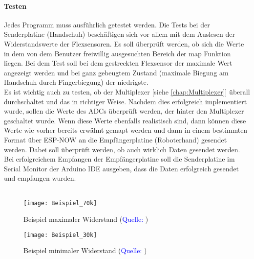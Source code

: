 \documentclass[titlepage,12pt,twoside]{article}
\begin{document}
\paragraph{Testen}
\hfill \break
\hfill \break
Jedes Programm muss ausführlich getestet werden. Die Tests bei der Senderplatine (Handschuh) beschäftigen sich vor allem mit 
dem Auslesen der Widerstandswerte der Flexsensoren. Es soll überprüft werden, ob sich die Werte in dem von dem Benutzer 
freiwillig ausgesuchten Bereich der map Funktion liegen. Bei dem Test soll bei dem gestreckten Flexsensor der maximale Wert 
angezeigt werden und bei ganz gebeugtem Zustand (maximale Biegung am Handschuh durch Fingerbiegung) der niedrigste. \\ 
Es ist wichtig auch zu testen, ob der Multiplexer [siehe \textcolor{blue}{\autoref{chap:Multiplexer}}] überall durchschaltet und das in richtiger Weise. Nachdem dies erfolgreich 
implementiert wurde, sollen die Werte des ADCs überprüft werden, der hinter den Multiplexer geschaltet wurde. Wenn diese Werte 
ebenfalls realistisch sind, dann können diese Werte wie vorher bereits erwähnt gemapt werden und dann in einem bestimmten Format 
über ESP-NOW an die Empfängerplatine (Roboterhand) gesendet werden. Dabei soll überprüft werden, ob auch wirklich Daten 
gesendet werden. Bei erfolgreichem Empfangen der Empfängerplatine soll die Senderplatine im Serial Monitor der Arduino IDE 
ausgeben, dass die Daten erfolgreich gesendet und empfangen wurden. \\
\\
\begin{figure}[H]
	\begin{center}
		\scalebox{0.7}
		{\texttt{[image: Beispiel\_70k]}}
		\caption{Beispiel maximaler Widerstand (\textcolor{blue}{Quelle: \cite{Pelayo}})}
		\label{fig:Beispiel_70k}			
	\end{center}
\end{figure}
\begin{figure}[H]
	\begin{center}
		\scalebox{0.7}
		{\texttt{[image: Beispiel\_30k]}}
		\caption{Beispiel minimaler Widerstand (\textcolor{blue}{Quelle: \cite{Pelayo}})}
		\label{fig:Beispiel_30k}			
	\end{center}
\end{figure}
\newpage
\end{document}
